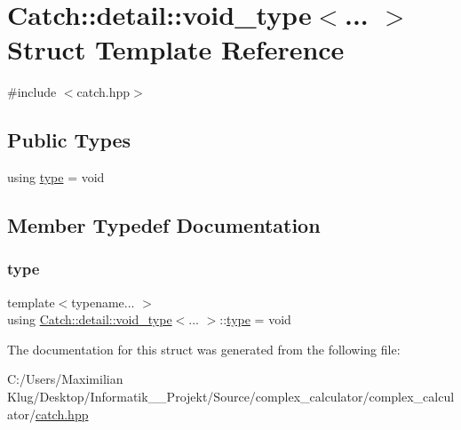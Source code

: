 \hypertarget{struct_catch_1_1detail_1_1void__type}{}\section{Catch\+:\+:detail\+:\+:void\+\_\+type$<$... $>$ Struct Template Reference}
\label{struct_catch_1_1detail_1_1void__type}


{\ttfamily \#include $<$catch.\+hpp$>$}

\subsection*{Public Types}
\begin{DoxyCompactItemize}
\item 
using \mbox{\hyperlink{struct_catch_1_1detail_1_1void__type_ae7ab54169b5452caa24063fef95adf02}{type}} = void
\end{DoxyCompactItemize}


\subsection{Member Typedef Documentation}
\mbox{\label{struct_catch_1_1detail_1_1void__type_ae7ab54169b5452caa24063fef95adf02}} 
\subsubsection{\texorpdfstring{type}{type}}
{\footnotesize\ttfamily template$<$typename... $>$ \\
using \mbox{\hyperlink{struct_catch_1_1detail_1_1void__type}{Catch\+::detail\+::void\+\_\+type}}$<$... $>$\+::\mbox{\hyperlink{struct_catch_1_1detail_1_1void__type_ae7ab54169b5452caa24063fef95adf02}{type}} =  void}



The documentation for this struct was generated from the following file\+:\begin{DoxyCompactItemize}
\item 
C\+:/\+Users/\+Maximilian Klug/\+Desktop/\+Informatik\+\_\+\_\+\+Projekt/\+Source/complex\+\_\+calculator/complex\+\_\+calculator/\mbox{\hyperlink{catch_8hpp}{catch.\+hpp}}\end{DoxyCompactItemize}
